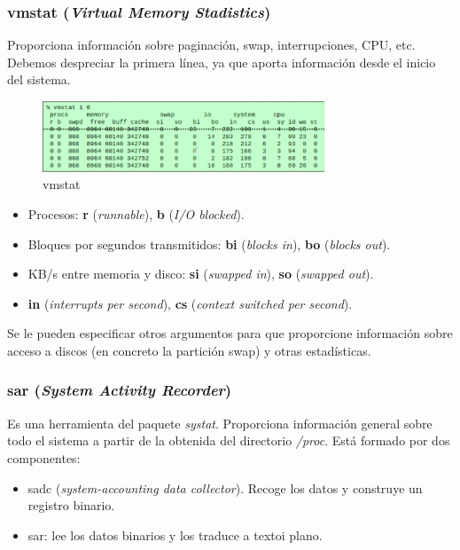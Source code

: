 \documentclass[12pt,spanish]{article}
\begin{document}
\subsubsection{vmstat (\textit{Virtual Memory Stadistics})}
Proporciona información sobre paginación, swap, interrupciones, CPU, etc.\\
Debemos despreciar la primera línea, ya que aporta información desde el inicio del sistema.

\begin{figure}[H]
	\centering
	\includegraphics[width=0.75\textwidth]{vmstat.png}
	\caption{vmstat}
\end{figure}

\begin{itemize}
	\item Procesos: \textbf{r} (\textit{runnable}), \textbf{b} (\textit{I/O blocked}).
	\item Bloques por segundos transmitidos: \textbf{bi} (\textit{blocks in}), \textbf{bo} (\textit{blocks out}).
	\item KB/s entre memoria y disco: \textbf{si} (\textit{swapped in}), \textbf{so} (\textit{swapped out}).
	\item \textbf{in} (\textit{interrupts per second}), \textbf{cs} (\textit{context switched per second}).
\end{itemize}

Se le pueden especificar otros argumentos para que proporcione información sobre acceso a discos (en concreto la partición swap) y otras estadísticas.

\subsubsection{sar (\textit{System Activity Recorder})}
Es una herramienta del paquete \textit{systat}. Proporciona información general sobre todo el sistema a partir de la obtenida del directorio \textit{/proc}. Está formado por dos componentes:
\begin{itemize}
	\item sadc (\textit{system-accounting data collector}). Recoge los datos y construye un registro binario.
	\item sar: lee los datos binarios y los traduce a textoi plano.
\end{itemize}
\end{document}
